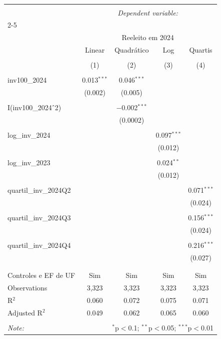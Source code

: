 
\begin{table}[!htbp] \centering 
  \caption{} 
  \label{} 
\begin{tabular}{@{\extracolsep{5pt}}lcccc} 
\\[-1.8ex]\hline 
\hline \\[-1.8ex] 
 & \multicolumn{4}{c}{\textit{Dependent variable:}} \\ 
\cline{2-5} 
\\[-1.8ex] & \multicolumn{4}{c}{Reeleito em 2024} \\ 
 & Linear & Quadrático & Log & Quartis \\ 
\\[-1.8ex] & (1) & (2) & (3) & (4)\\ 
\hline \\[-1.8ex] 
 inv100\_2024 & 0.013$^{***}$ & 0.046$^{***}$ &  &  \\ 
  & (0.002) & (0.005) &  &  \\ 
  & & & & \\ 
 I(inv100\_2024$\hat{\mkern6mu}$2) &  & $-$0.002$^{***}$ &  &  \\ 
  &  & (0.0002) &  &  \\ 
  & & & & \\ 
 log\_inv\_2024 &  &  & 0.097$^{***}$ &  \\ 
  &  &  & (0.012) &  \\ 
  & & & & \\ 
 log\_inv\_2023 &  &  & 0.024$^{**}$ &  \\ 
  &  &  & (0.012) &  \\ 
  & & & & \\ 
 quartil\_inv\_2024Q2 &  &  &  & 0.071$^{***}$ \\ 
  &  &  &  & (0.024) \\ 
  & & & & \\ 
 quartil\_inv\_2024Q3 &  &  &  & 0.156$^{***}$ \\ 
  &  &  &  & (0.024) \\ 
  & & & & \\ 
 quartil\_inv\_2024Q4 &  &  &  & 0.216$^{***}$ \\ 
  &  &  &  & (0.027) \\ 
  & & & & \\ 
\hline \\[-1.8ex] 
Controles e EF de UF & Sim & Sim & Sim & Sim \\ 
Observations & 3,323 & 3,323 & 3,323 & 3,323 \\ 
R$^{2}$ & 0.060 & 0.072 & 0.075 & 0.071 \\ 
Adjusted R$^{2}$ & 0.049 & 0.062 & 0.065 & 0.060 \\ 
\hline 
\hline \\[-1.8ex] 
\textit{Note:}  & \multicolumn{4}{r}{$^{*}$p$<$0.1; $^{**}$p$<$0.05; $^{***}$p$<$0.01} \\ 
\end{tabular} 
\end{table} 
